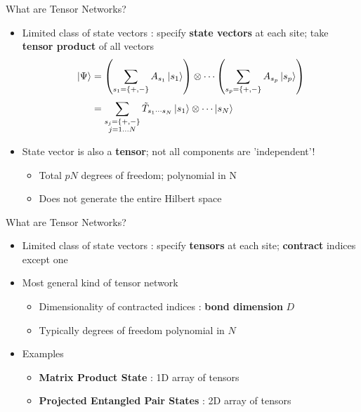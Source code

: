 \documentclass{beamer}
\begin{document}
\begin{frame}{What are Tensor Networks?}
	\begin{itemize}
		\item Limited class of state vectors : specify \textbf{state vectors} at each site; take \textbf{tensor product} of all vectors
			\begin{align}
		\ket{\Psi } &= \left( \sum_{s_{1}=\{+,-\}}^{} A_{s_{1}}\ket{s_{1}} \right) \otimes \cdots \left( \sum_{s_{p}=\{+,-\}}^{} A_{s_{p}}\ket{s_{p}} \right) \\  
					&= \sum_{\substack{s_{j}=\{+,-\}\\j=1\dots N}}^{} \tilde{T}_{s_{1}\cdots s_{N}}\ket{s_{1}}\otimes \cdots \ket{s_{N}} \\
	\end{align}
	\item State vector is also a \textbf{tensor}; not all components are 'independent'!
		\begin{itemize}
		\item Total ${ pN }$ degrees of freedom; polynomial in N
		\item Does not generate the entire Hilbert space
		\end{itemize}
	\end{itemize}
\end{frame}

\begin{frame}{What are Tensor Networks?}
	\begin{itemize}
		\item Limited class of state vectors : specify \textbf{tensors} at each site; \textbf{contract} indices except one
		\item Most general kind of tensor network
			\begin{itemize}
				\item Dimensionality of contracted indices : \textbf{bond dimension} ${ D }$
				\item Typically degrees of freedom polynomial in ${ N }$
			\end{itemize}
		\item Examples
			\begin{itemize}
				\item \textbf{Matrix Product State} : 1D array of tensors
				\item \textbf{Projected Entangled Pair States} : 2D array of tensors
			\end{itemize}
		
	\end{itemize}
\end{frame}
\end{document}
